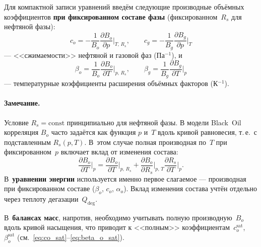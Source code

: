 \documentclass[12pt,a4paper]{article}
\begin{document}
Для компактной записи уравнений введём следующие производные объёмных
коэффициентов \textbf{при фиксированном составе фазы}
(фиксированном~$R_s$ для нефтяной фазы):
\begin{equation}\label{eq:co_cg}
  c_o = -\frac{1}{B_o}\frac{\partial B_o}{\partial p}\bigg|_{T,\,R_s},
  \qquad
  c_g = -\frac{1}{B_g}\frac{\partial B_g}{\partial p}\bigg|_T
\end{equation}
--- <<сжимаемости>> нефтяной и газовой фаз (Па$^{-1}$), и
\begin{equation}\label{eq:beta_o_g}
  \beta_o = \frac{1}{B_o}\frac{\partial B_o}{\partial T}\bigg|_{p,\,R_s},
  \qquad
  \beta_g = \frac{1}{B_g}\frac{\partial B_g}{\partial T}\bigg|_p
\end{equation}
--- температурные коэффициенты расширения объёмных факторов (К$^{-1}$).

\paragraph{Замечание.}
Условие $R_s = \mathrm{const}$ принципиально для нефтяной фазы.
В модели Black~Oil корреляция $B_o$ часто задаётся как функция $p$
и~$T$ вдоль кривой равновесия, т.\,е.\ с подставленным $R_s(p,T)$.
В~этом случае полная производная по~$T$ при фиксированном~$p$ включает
вклад от изменения состава:
\begin{equation}\label{eq:beta_o_full}
  \frac{\partial B_o}{\partial T}\bigg|_p
  = \frac{\partial B_o}{\partial T}\bigg|_{p,\,R_s}
    + \frac{\partial B_o}{\partial R_s}\bigg|_{p,\,T}
      \frac{\partial R_s}{\partial T}\bigg|_p.
\end{equation}
В~\textbf{уравнении энергии} используется именно первое слагаемое ---
производная при фиксированном составе ($\beta_o$, $c_o$, $\alpha_o$).
Вклад изменения состава учтён отдельно через теплоту
дегазации~$Q_{\mathrm{deg}}$.

В~\textbf{балансах масс}, напротив, необходимо учитывать полную
производную~$B_o$ вдоль кривой насыщения, что приводит к <<полным>>
коэффициентам~$c_o^{\mathrm{sat}}$, $\beta_o^{\mathrm{sat}}$
(см.~\eqref{eq:co_sat}--\eqref{eq:beta_o_sat}).
\end{document}
